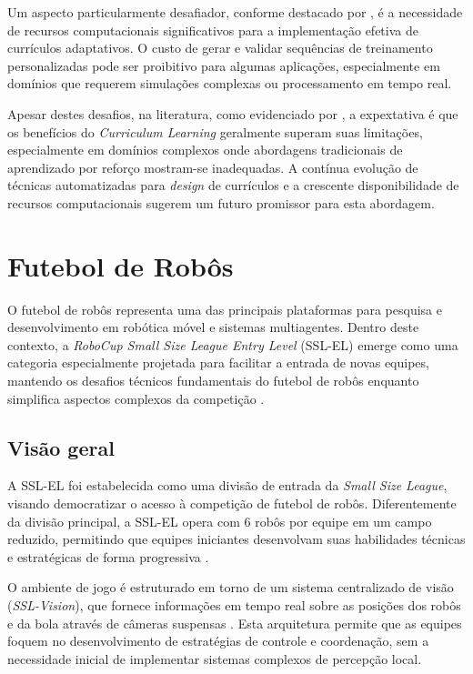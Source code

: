 Um aspecto particularmente desafiador, conforme destacado por \cite{curml}, é a necessidade de recursos computacionais significativos para a implementação efetiva de currículos adaptativos. O custo de gerar e validar sequências de treinamento personalizadas pode ser proibitivo para algumas aplicações, especialmente em domínios que requerem simulações complexas ou processamento em tempo real.

Apesar destes desafios, na literatura, como evidenciado por \cite{curriculum_learning_a_survey}, a expextativa é que os benefícios do \textit{Curriculum Learning} geralmente superam suas limitações, especialmente em domínios complexos onde abordagens tradicionais de aprendizado por reforço mostram-se inadequadas. A contínua evolução de técnicas automatizadas para \textit{design} de currículos e a crescente disponibilidade de recursos computacionais sugerem um futuro promissor para esta abordagem.

\section{Futebol de Robôs}
\label{sec:futebol_robos}

O futebol de robôs representa uma das principais plataformas para pesquisa e desenvolvimento em robótica móvel e sistemas multiagentes. Dentro deste contexto, a \textit{RoboCup Small Size League Entry Level} (SSL-EL) emerge como uma categoria especialmente projetada para facilitar a entrada de novas equipes, mantendo os desafios técnicos fundamentais do futebol de robôs enquanto simplifica aspectos complexos da competição \cite{regras_ssl_el_2024}.

\subsection{Visão geral}
\label{subsec:futebol_visao}

A SSL-EL foi estabelecida como uma divisão de entrada da \textit{Small Size League}, visando democratizar o acesso à competição de futebol de robôs. Diferentemente da divisão principal, a SSL-EL opera com 6 robôs por equipe em um campo reduzido, permitindo que equipes iniciantes desenvolvam suas habilidades técnicas e estratégicas de forma progressiva \cite{regras_ssl_el_2024}.

O ambiente de jogo é estruturado em torno de um sistema centralizado de visão (\textit{SSL-Vision}), que fornece informações em tempo real sobre as posições dos robôs e da bola através de câmeras suspensas \cite{ssl_overview}. Esta arquitetura permite que as equipes foquem no desenvolvimento de estratégias de controle e coordenação, sem a necessidade inicial de implementar sistemas complexos de percepção local.

